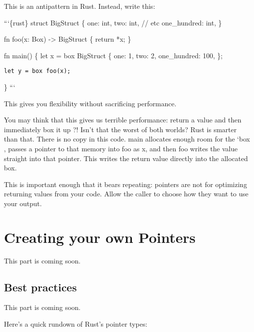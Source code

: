 \documentclass[]{article}
\begin{document}
This is an antipattern in Rust. Instead, write this:

```\{rust\} struct BigStruct \{ one: int, two: int, // etc one\_hundred:
int, \}

fn foo(x: Box) -\textgreater{} BigStruct \{ return *x; \}

fn main() \{ let x = box BigStruct \{ one: 1, two: 2, one\_hundred: 100,
\};

\begin{verbatim}
let y = box foo(x);
\end{verbatim}

\} ```

This gives you flexibility without sacrificing performance.

You may think that this gives us terrible performance: return a value
and then immediately box it up ?! Isn't that the worst of both worlds?
Rust is smarter than that. There is no copy in this code. main allocates
enough room for the `box , passes a pointer to that memory into foo as
x, and then foo writes the value straight into that pointer. This writes
the return value directly into the allocated box.

This is important enough that it bears repeating: pointers are not for
optimizing returning values from your code. Allow the caller to choose
how they want to use your output.

\section{Creating your own Pointers}\label{creating-your-own-pointers}

This part is coming soon.

\subsection{Best practices}\label{best-practices-5}

This part is coming soon.


Here's a quick rundown of Rust's pointer types:
\end{document}
